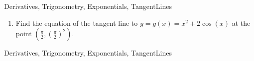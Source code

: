 \begin{tagblock}{Derivatives, Trigonometry, Exponentials, TangentLines}
\begin{question}
\begin{enumerate}
\vspace{1.3in}


\item Find the equation of the tangent line to $y=g(x)=x^2+2\cos(x)$ at the point $(\frac{\pi}{2}, (\frac{\pi}{2})^2)$.

\vspace{2in}


 \end{enumerate}









	









	
	
\begin{tags}
	    Derivatives, Trigonometry, Exponentials, TangentLines
\end{tags}
	
\begin{diary}
\end{diary}
	
\begin{solution}
	   
\end{solution}
	
\end{question}

\end{tagblock}


